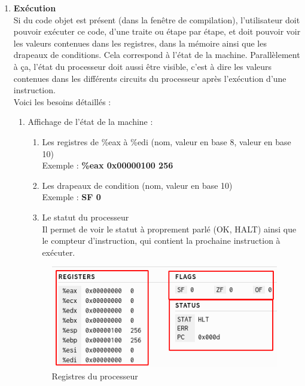 \documentclass[french]{article}
\begin{document}
\begin{enumerate}
    
    \item \textbf{Exécution} \\
    Si du code objet est présent (dans la fenêtre de compilation), l'utilisateur doit pouvoir exécuter ce code, d'une traite ou étape par étape, et doit pouvoir voir les valeurs contenues dans les registres, dans la mémoire ainsi que les drapeaux de conditions. Cela correspond à l'état de la machine. Parallèlement à ça, l'état du processeur doit aussi être visible, c'est à dire les valeurs contenues dans les différents circuits du processeur après l'exécution d'une instruction.\\ %

    Voici les besoins détaillés :
    \begin{enumerate}
            \item Affichage de l'état de la machine :
            \begin{enumerate}
                \item Les registres de \%eax à \%edi (nom, valeur en base 8, valeur en base 10)\\
                Exemple : \textbf{\%eax 0x00000100 256}
                \item Les drapeaux de condition (nom, valeur en base 10)\\
                Exemple : \textbf{SF 0}
                \item Le statut du processeur\\
                Il permet de voir le statut à proprement parlé (OK, HALT) ainsi que le compteur d'instruction, qui contient la prochaine instruction à exécuter.
            \end{enumerate}{}
            \begin{figure}[H]
                \centering
                \includegraphics{img/ex_vue_registres.png}
                \caption{Registres du processeur}
                \label{fig:ex_vue_registres}
            \end{figure}
            

\end{enumerate}
\end{enumerate}
\end{document}
